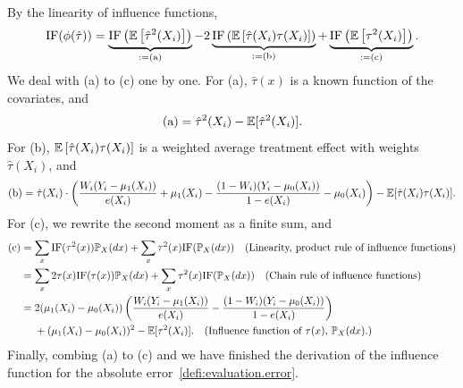     
    By the linearity of influence functions, 
    \begin{align*}
        \text{IF}(\phi(\hat{\tau}))
        = \underbrace{\text{IF}\left(\mathbb{E}\left[\hat{\tau}^2(X_i)\right]\right)}_{:=\text{(a)}} 
        - 2\underbrace{\text{IF}\left(\mathbb{E}\left[\hat{\tau}(X_i) {\tau}(X_i)\right]\right)}_{:=\text{(b)}}
        + \underbrace{\text{IF}\left(\mathbb{E}\left[\tau^2(X_i)\right]\right)}_{:=\text{(c)}}.
    \end{align*}
    We deal with (a) to (c) one by one.
    For (a), $\hat{\tau}(x)$ is a known function of the covariates, and
    \begin{align}\label{proof:absolute.error.(a)}
        \text{(a)} = \hat{\tau}^2(X_i) - \mathbb{E}[\hat{\tau}^2(X_i)].
    \end{align}
    For (b), $\mathbb{E}\left[\hat{\tau}(X_i) {\tau}(X_i)\right]$ is a weighted average treatment effect with weights $\hat{\tau}(X_i)$, and 
    \begin{align}\label{proof:absolute.error.(b)}
        \text{(b)} = \hat{\tau}(X_i) \cdot \left(\frac{W_i(Y_i - \mu_1(X_i))}{e(X_i)} + \mu_1(X_i) - \frac{(1-W_i)(Y_i - \mu_0(X_i))}{1-e(X_i)} - \mu_0(X_i) \right) - \mathbb{E}[\hat{\tau}(X_i) \tau(X_i)].
    \end{align}
    For (c), we rewrite the second moment as a finite sum, and
    \begin{align}\label{proof:absolute.error.(c)}
        \begin{split}
    \text{(c)} 
        &= \sum_x \text{IF}(\tau^2(x)) \mathbb{P}_X(dx) +  \sum_x \tau^2(x) \text{IF}(\mathbb{P}_X(dx)) \quad (\text{Linearity, product rule of influence functions})\\
        &= \sum_x 2 \tau(x) \text{IF}(\tau(x)) \mathbb{P}_X(dx) + \sum_x \tau^2(x) \text{IF}(\mathbb{P}_X(dx)) \quad (\text{Chain rule of influence functions}) \\
        &= 2(\mu_1(X_i) - \mu_0(X_i)) \left(\frac{W_i(Y_i - \mu_1(X_i))}{e(X_i)} - \frac{(1-W_i)(Y_i - \mu_0(X_i))}{1-e(X_i)}\right) \\
        &\quad~ + (\mu_1(X_i) - \mu_0(X_i))^2- \mathbb{E}[\tau^2(X_i)]. \quad (\text{Influence function of $\tau(x)$, $\mathbb{P}_X(dx)$.})
        \end{split}
    \end{align}
    Finally, combing (a) to (c) and we have finished the derivation of the influence function for the absolute error~\eqref{defi:evaluation.error}.
       
